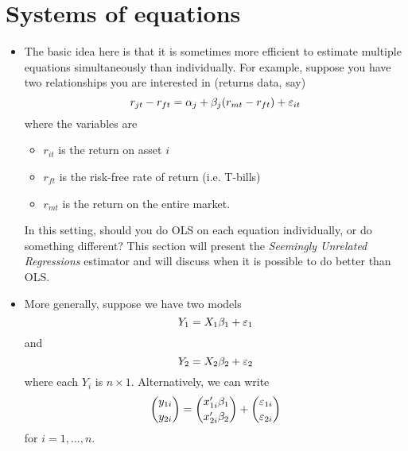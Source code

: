 

\chapter{Systems of equations}

\begin{itemize}[leftmargin=0pt]

\item The basic idea here is that it is sometimes more efficient to
  estimate multiple equations simultaneously than individually.  For
  example, suppose you have two relationships you are interested in
  (returns data, say)
  \begin{equation*}
    r_{jt} - r_{ft} = \alpha_j + \beta_j (r_{mt} - r_{ft}) + \varepsilon_{it}
  \end{equation*}
  where the variables are
  \begin{itemize}
  \item $r_{it}$ is the return on asset $i$
  \item $r_{ft}$ is the risk-free rate of return (i.e. T-bills)
  \item $r_{mt}$ is the return on the entire market.
  \end{itemize}

  In this setting, should you do OLS on each equation individually, or
  do something different? This section will present the
  \emph{Seemingly Unrelated Regressions} estimator and will discuss
  when it is possible to do better than OLS.

\item More generally, suppose we have two models
  \begin{equation}\label{eq:3}
    Y_1 = X_1 \beta_1 + \vep_1
  \end{equation}
  and
  \begin{equation}\label{eq:4}
    Y_2 = X_2 \beta_2 + \vep_2
  \end{equation}
  where each $Y_i$ is $n \times 1$.  Alternatively, we can write
  \begin{equation*}
    \binom{y_{1i}}{y_{2i}}
    = \binom{x_{1i}'\beta_1}{x_{2i}'\beta_2} +  \binom{\varepsilon_{1i}}{ \varepsilon_{2i}}
  \end{equation*}
  for $i = 1,...,n$.


\end{itemize}
